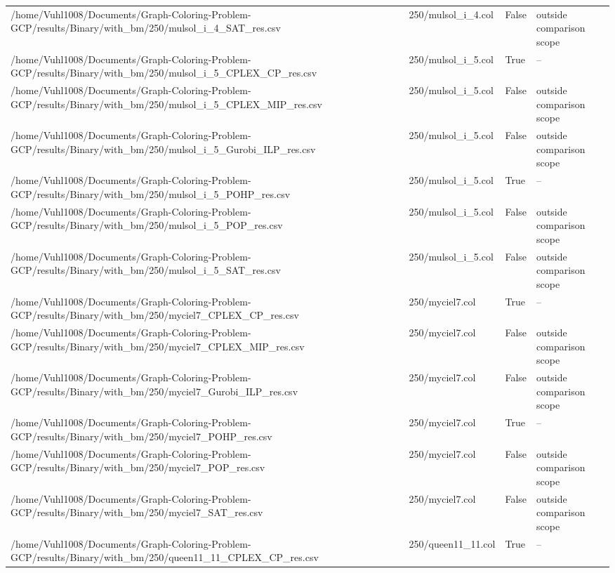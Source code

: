 \begin{table}[htbp]
\begin{tabular}{llll}
/home/Vuhl1008/Documents/Graph-Coloring-Problem-GCP/results/Binary/with\_bm/250/mulsol\_i\_4\_SAT\_res.csv & 250/mulsol\_i\_4.col & False & outside comparison scope \\
/home/Vuhl1008/Documents/Graph-Coloring-Problem-GCP/results/Binary/with\_bm/250/mulsol\_i\_5\_CPLEX\_CP\_res.csv & 250/mulsol\_i\_5.col & True & -- \\
/home/Vuhl1008/Documents/Graph-Coloring-Problem-GCP/results/Binary/with\_bm/250/mulsol\_i\_5\_CPLEX\_MIP\_res.csv & 250/mulsol\_i\_5.col & False & outside comparison scope \\
/home/Vuhl1008/Documents/Graph-Coloring-Problem-GCP/results/Binary/with\_bm/250/mulsol\_i\_5\_Gurobi\_ILP\_res.csv & 250/mulsol\_i\_5.col & False & outside comparison scope \\
/home/Vuhl1008/Documents/Graph-Coloring-Problem-GCP/results/Binary/with\_bm/250/mulsol\_i\_5\_POHP\_res.csv & 250/mulsol\_i\_5.col & True & -- \\
/home/Vuhl1008/Documents/Graph-Coloring-Problem-GCP/results/Binary/with\_bm/250/mulsol\_i\_5\_POP\_res.csv & 250/mulsol\_i\_5.col & False & outside comparison scope \\
/home/Vuhl1008/Documents/Graph-Coloring-Problem-GCP/results/Binary/with\_bm/250/mulsol\_i\_5\_SAT\_res.csv & 250/mulsol\_i\_5.col & False & outside comparison scope \\
/home/Vuhl1008/Documents/Graph-Coloring-Problem-GCP/results/Binary/with\_bm/250/myciel7\_CPLEX\_CP\_res.csv & 250/myciel7.col & True & -- \\
/home/Vuhl1008/Documents/Graph-Coloring-Problem-GCP/results/Binary/with\_bm/250/myciel7\_CPLEX\_MIP\_res.csv & 250/myciel7.col & False & outside comparison scope \\
/home/Vuhl1008/Documents/Graph-Coloring-Problem-GCP/results/Binary/with\_bm/250/myciel7\_Gurobi\_ILP\_res.csv & 250/myciel7.col & False & outside comparison scope \\
/home/Vuhl1008/Documents/Graph-Coloring-Problem-GCP/results/Binary/with\_bm/250/myciel7\_POHP\_res.csv & 250/myciel7.col & True & -- \\
/home/Vuhl1008/Documents/Graph-Coloring-Problem-GCP/results/Binary/with\_bm/250/myciel7\_POP\_res.csv & 250/myciel7.col & False & outside comparison scope \\
/home/Vuhl1008/Documents/Graph-Coloring-Problem-GCP/results/Binary/with\_bm/250/myciel7\_SAT\_res.csv & 250/myciel7.col & False & outside comparison scope \\
/home/Vuhl1008/Documents/Graph-Coloring-Problem-GCP/results/Binary/with\_bm/250/queen11\_11\_CPLEX\_CP\_res.csv & 250/queen11\_11.col & True & -- \\

\end{tabular}
\end{table}
